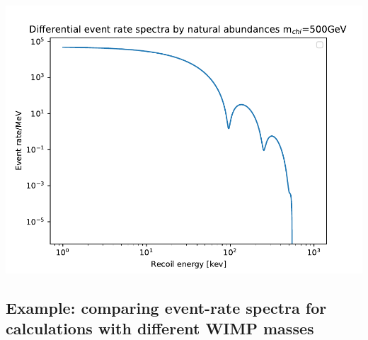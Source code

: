 \documentclass[
14pt, %
a4paper, %
oneside, %
headinclude,footinclude, %
BCOR5mm, %
]{scrartcl}
\begin{document}
{
	\centering
\includegraphics[width=\textwidth]{weightedspectra.pdf}

}

\subsection{Example: comparing event-rate spectra for
calculations with different WIMP masses}


\clearpage
\end{document}

